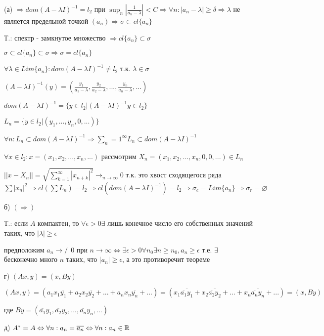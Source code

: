 \documentclass[russian]{article}
\begin{document}
(а) $ \Rightarrow dom(A-\lambda I)^{-1}=l_2$ при $ \sup_n |\frac{1}{a_n-\lambda}|<C \Rightarrow \forall n : |a_n - \lambda| \ge \delta \Rightarrow \lambda$ не является предельной точкой $(a_n) \Rightarrow \sigma \subset cl\{a_n\}$

Т.: спектр - замкнутое множество $ \Rightarrow cl\{a_n\} \subset \sigma$

$\sigma \subset cl\{a_n\} \subset \sigma \Rightarrow \sigma = cl\{a_n\}$

$\forall \lambda \in Lim\{a_n\} : dom(A-\lambda I)^{-1} \ne l_2$ т.к. $\lambda \in \sigma$

$(A-\lambda I)^{-1}(y) = (\frac{y_1}{a_1-\lambda}, \frac{y_2}{a_2-\lambda}, ..., \frac{y_n}{a_n-\lambda}, ...)$

$dom(A-\lambda I)^{-1}=\{y \in l_2|(A-\lambda I)^{-1}y \in l_2\}$

$L_n = \{y \in l_2 | (y_1, ..., y_n, 0 , ...)\}$

$\forall n : L_n \subset dom(A-\lambda I)^{-1} \Rightarrow \sum _n=1 ^\infty L_n \subset dom(A- \lambda I)^{-1}$

$\forall x \in l_2 : x=(x_1, x_2, ..., x_n, ...)$ рассмотрим $X_n = (x_1, x_2, ..., x_n, 0, 0, ...) \in L_n$

$||x-X_n|| = \sqrt{\sum_{k=1}^\infty |x_{n+k}|^2}\rightarrow_{n\rightarrow \infty} 0$ т.к. это хвост сходящегося ряда $\sum|x_n|^2 \Rightarrow cl(\sum L_n)=l_2 \Rightarrow cl(dom(A-\lambda I)^{-1})=l_2 \Rightarrow \sigma_c = Lim \{a_n\} \Rightarrow \sigma_r = \varnothing$

б) $(\Rightarrow) $

Т.: если $A$ компактен, то $\forall \epsilon > 0 \exists $ лишь конечное число его собственных значений таких, что $|\lambda| \ge \epsilon$

предположим $a_n \to\!\!\!\!\!\!/\ \ 0$ при $n \to \infty \Leftrightarrow \exists \epsilon > 0 \forall n_0 \exists n \ge n_0, a_n \ge \epsilon$ т.е. $\exists $ бесконечно много $n$ таких, что $|a_n| \ge \epsilon$, а это противоречит теореме

г) $(Ax, y) = (x, By)$

$(Ax, y) = (a_1 x_1 \overline{y_1} + a_2 x_2 \overline{y_2} + ... + a_n x_n \overline{y_n} + ...) = (x_1 \overline{\overline{a_1}y_1} + x_2 \overline{\overline{a_2}y_2} + ... + x_n \overline{\overline{a_n}y_n} + ...) = (x, By)$

где $By = (\overline{a_1}y_1, \overline{a_2}y_2, ..., \overline{a_n}y_n, ...)$

д) $A^* = A \Leftrightarrow \forall n : a_n = \overline{a_n} \Leftrightarrow \forall n : a_n \in \Bbb R$
\end{document}
